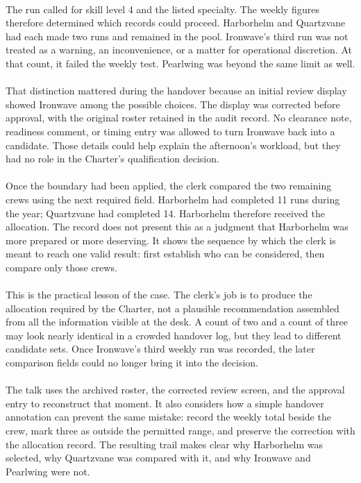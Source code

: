 \documentclass[9pt]{article}
\begin{document}
\begin{minipage}[t]{\textwidth}
\begin{minipage}[t]{0.49\textwidth}
\begin{exbox}
{  \  \\
  The run called for skill level 4 and the listed specialty. The weekly figures therefore determined which records could proceed. Harborhelm and Quartzvane had each made two runs and remained in the pool. Ironwave's third run was not treated as a warning, an inconvenience, or a matter for operational discretion. At that count, it failed the weekly test. Pearlwing was beyond the same limit as well. \\
  \  \\
  That distinction mattered during the handover because an initial review display showed Ironwave among the possible choices. The display was corrected before approval, with the original roster retained in the audit record. No clearance note, readiness comment, or timing entry was allowed to turn Ironwave back into a candidate. Those details could help explain the afternoon's workload, but they had no role in the Charter's qualification decision. \\
  \  \\
  Once the boundary had been applied, the clerk compared the two remaining crews using the next required field. Harborhelm had completed 11 runs during the year; Quartzvane had completed 14. Harborhelm therefore received the allocation. The record does not present this as a judgment that Harborhelm was more prepared or more deserving. It shows the sequence by which the clerk is meant to reach one valid result: first establish who can be considered, then compare only those crews. \\
  \  \\
  This is the practical lesson of the case. The clerk's job is to produce the allocation required by the Charter, not a plausible recommendation assembled from all the information visible at the desk. A count of two and a count of three may look nearly identical in a crowded handover log, but they lead to different candidate sets. Once Ironwave's third weekly run was recorded, the later comparison fields could no longer bring it into the decision. \\
  \  \\
  The talk uses the archived roster, the corrected review screen, and the approval entry to reconstruct that moment. It also considers how a simple handover annotation can prevent the same mistake: record the weekly total beside the crew, mark three as outside the permitted range, and preserve the correction with the allocation record. The resulting trail makes clear why Harborhelm was selected, why Quartzvane was compared with it, and why Ironwave and Pearlwing were not.}
\end{exbox}
\end{minipage}
\end{minipage}
\clearpage
\end{document}
